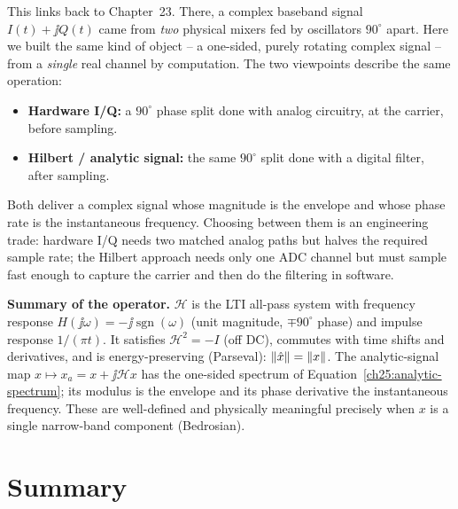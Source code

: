 This links back to Chapter~23. There, a complex baseband signal $I(t)+\jj Q(t)$ came
from \emph{two} physical mixers fed by oscillators $90^\circ$ apart. Here we built the same
kind of object -- a one-sided, purely rotating complex signal -- from a \emph{single} real
channel by computation. The two viewpoints describe the same operation:

\begin{itemize}
  \item \textbf{Hardware I/Q:} a $90^\circ$ phase split done with analog circuitry, at the
        carrier, before sampling.
  \item \textbf{Hilbert / analytic signal:} the same $90^\circ$ split done with a digital
        filter, after sampling.
\end{itemize}

Both deliver a complex signal whose magnitude is the envelope and whose phase rate is the
instantaneous frequency. Choosing between them is an engineering trade: hardware I/Q needs
two matched analog paths but halves the required sample rate; the Hilbert approach needs
only one ADC channel but must sample fast enough to capture the carrier and then do the
filtering in software.

\begin{formalbox}
\textbf{Summary of the operator.}
$\mathcal{H}$ is the LTI all-pass system with frequency response
$H(\jj\omega)=-\jj\operatorname{sgn}(\omega)$ (unit magnitude, $\mp 90^\circ$ phase) and
impulse response $1/(\pi t)$. It satisfies $\mathcal{H}^2=-I$ (off DC), commutes with time
shifts and derivatives, and is energy-preserving (Parseval): $\lVert\hat x\rVert=\lVert x\rVert$.
The analytic-signal map $x\mapsto x_a=x+\jj\mathcal H x$ has the one-sided spectrum of
Equation~\eqref{ch25:analytic-spectrum}; its modulus is the envelope and its phase
derivative the instantaneous frequency. These are well-defined and physically meaningful
precisely when $x$ is a single narrow-band component (Bedrosian).
\end{formalbox}

\section{Summary}
\label{ch25:summary}

